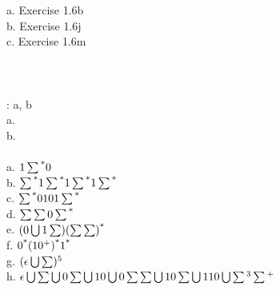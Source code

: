 \documentclass[12pt]{article}
\begin{document}
a. Exercise 1.6b \\

b. Exercise 1.6j \\

c. Exercise 1.6m \\

 \\


 \\


 \\


: a, b \\

a. \\

b. \\

 \\

a. $1\sum\textsuperscript{*}0$ \\

b. $\sum\textsuperscript{*}1\sum\textsuperscript{*}1\sum\textsuperscript{*}1\sum\textsuperscript{*}$ \\

c. $\sum\textsuperscript{*}0101\sum\textsuperscript{*}$ \\

d. $\sum\sum0\sum\textsuperscript{*}$ \\

e. $(0\bigcup1\sum)(\sum\sum)\textsuperscript{*}$ \\

f. $0\textsuperscript{*}(10\textsuperscript{+})\textsuperscript{*}1\textsuperscript{*}$ \\

g. $(\epsilon\bigcup\sum)\textsuperscript{5}$ \\

h. $\epsilon \bigcup \sum \bigcup 0 \sum \bigcup 10 \bigcup 0 \sum\sum \bigcup 10\sum \bigcup 110 \bigcup \sum \textsuperscript{3} \sum \textsuperscript{+} $ \\
\end{document}
